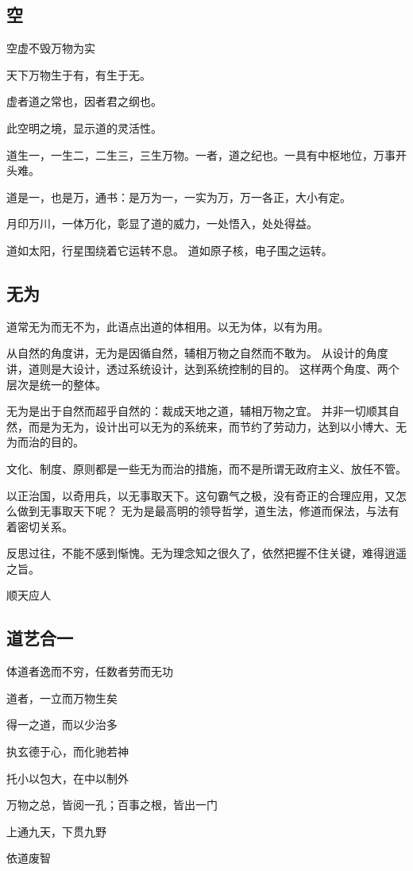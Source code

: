 \subsection{空}

\begin{enumbox}
\item 空虚不毁万物为实
\item 天下万物生于有，有生于无。
\item 虚者道之常也，因者君之纲也。
\end{enumbox}

此空明之境，显示道的灵活性。

道生一，一生二，二生三，三生万物。一者，道之纪也。一具有中枢地位，万事开头难。

道是一，也是万，通书：是万为一，一实为万，万一各正，大小有定。

月印万川，一体万化，彰显了道的威力，一处悟入，处处得益。

道如太阳，行星围绕着它运转不息。
道如原子核，电子围之运转。

\subsection{无为}

道常无为而无不为，此语点出道的体相用。以无为体，以有为用。

从自然的角度讲，无为是因循自然，辅相万物之自然而不敢为。
从设计的角度讲，道则是大设计，透过系统设计，达到系统控制的目的。
这样两个角度、两个层次是统一的整体。

无为是出于自然而超乎自然的：裁成天地之道，辅相万物之宜。
并非一切顺其自然，而是为无为，设计出可以无为的系统来，而节约了劳动力，达到以小博大、无为而治的目的。

文化、制度、原则都是一些无为而治的措施，而不是所谓无政府主义、放任不管。

以正治国，以奇用兵，以无事取天下。这句霸气之极，没有奇正的合理应用，又怎么做到无事取天下呢？
无为是最高明的领导哲学，道生法，修道而保法，与法有着密切关系。

反思过往，不能不感到惭愧。无为理念知之很久了，依然把握不住关键，难得逍遥之旨。

顺天应人

\subsection{道艺合一}

\begin{enumbox}
\item 体道者逸而不穷，任数者劳而无功
\item 道者，一立而万物生矣
\item 得一之道，而以少治多
\item 执玄德于心，而化驰若神
\item 托小以包大，在中以制外
\item 万物之总，皆阅一孔；百事之根，皆出一门
\item 上通九天，下贯九野
\item 依道废智
\end{enumbox}

